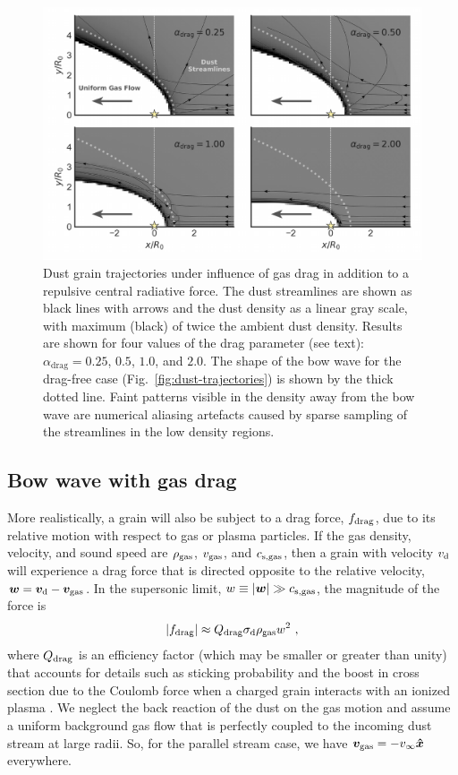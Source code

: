 \begin{figure}
  \centering
  \includegraphics[width=\linewidth]{figs/dust-couple-stream-annotate}
  \caption{Dust grain trajectories under influence of gas drag in
    addition to a repulsive central radiative force.  The dust
    streamlines are shown as black lines with arrows and the dust
    density as a linear gray scale, with maximum (black) of twice the
    ambient dust density.  Results are shown for four values of the
    drag parameter (see text): \(\alpha_\text{drag} = 0.25\), \(0.5\),
    \(1.0\), and \(2.0\). The shape of the bow wave for the drag-free
    case (Fig.~\ref{fig:dust-trajectories}) is shown by the thick
    dotted line.  Faint patterns visible in the density away from the
    bow wave are numerical aliasing artefacts caused by sparse
    sampling of the streamlines in the low density regions.}
  \label{fig:dust-wave-coupling}
\end{figure}


\subsection{Bow wave with gas drag}
\label{sec:bow-wave-drag}

More realistically, a grain will also be subject to a drag force,
\(f_{\text{drag}}\), due to its relative motion with respect to gas or plasma
particles. If the gas density, velocity, and sound speed are
\(\rho_{\text{gas}}\), \(v_{\text{gas}}\), and \(c_{\text{s,gas}}\), then a grain with velocity
\(v_{\text{d}}\) will experience a drag force that is directed opposite to
the relative velocity, \(\bm{w} = \bm{v}_{\text{d}} - \bm{v}_{\text{gas}}\).  In the
supersonic limit, \(w \equiv \lvert\bm{w}\rvert \gg c_{\text{s,gas}}\), the magnitude of
the force is
\begin{equation}
  \label{eq:dust-fdrag}
  \lvert f_{\text{drag}}\rvert \approx Q_{\text{drag}} \sigma_{\text{d}} \rho_{\text{gas}} w^2 \ ,
\end{equation}
where \(Q_{\text{drag}}\) is an efficiency factor (which may be smaller or
greater than unity) that accounts for details such as sticking
probability and the boost in cross section due to the Coulomb force
when a charged grain interacts with an ionized plasma
\citep{Draine:1979a}.  We neglect the back reaction of the dust on the
gas motion and assume a uniform background gas flow that is perfectly
coupled to the incoming dust stream at large radii.  So, for the
parallel stream case, we have \(\bm{v}_{\text{gas}} = -v_\infty \bm{\hat{x}}\) everywhere.

